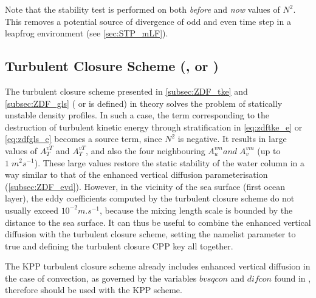 \documentclass[../main/NEMO_manual]{subfiles}
\begin{document}
Note that the stability test is performed on both \textit{before} and \textit{now} values of $N^2$.
This removes a potential source of divergence of odd and even time step in
a leapfrog environment \citep{Leclair_PhD2010} (see \autoref{sec:STP_mLF}).

\subsection[Turbulent closure scheme (\protect\key{zdf}\{tke,gls,osm\})]{Turbulent Closure Scheme (\protect{}, \protect{} or \protect{})}
\label{subsec:ZDF_tcs}

The turbulent closure scheme presented in \autoref{subsec:ZDF_tke} and \autoref{subsec:ZDF_gls}
( or  is defined) in theory solves the problem of statically unstable density profiles.
In such a case, the term corresponding to the destruction of turbulent kinetic energy through stratification in
\autoref{eq:zdftke_e} or \autoref{eq:zdfgls_e} becomes a source term, since $N^2$ is negative. 
It results in large values of $A_T^{vT}$ and  $A_T^{vT}$, and also the four neighbouring $A_u^{vm} {and}\;A_v^{vm}$
(up to $1\;m^2s^{-1}$).
These large values restore the static stability of the water column in a way similar to that of
the enhanced vertical diffusion parameterisation (\autoref{subsec:ZDF_evd}).
However, in the vicinity of the sea surface (first ocean layer), the eddy coefficients computed by
the turbulent closure scheme do not usually exceed $10^{-2}m.s^{-1}$,
because the mixing length scale is bounded by the distance to the sea surface.
It can thus be useful to combine the enhanced vertical diffusion with the turbulent closure scheme,
\ie setting the  namelist parameter to true and
defining the turbulent closure CPP key all together.

The KPP turbulent closure scheme already includes enhanced vertical diffusion in the case of convection,
as governed by the variables $bvsqcon$ and $difcon$ found in ,
therefore  should be used with the KPP scheme.

\end{document}
